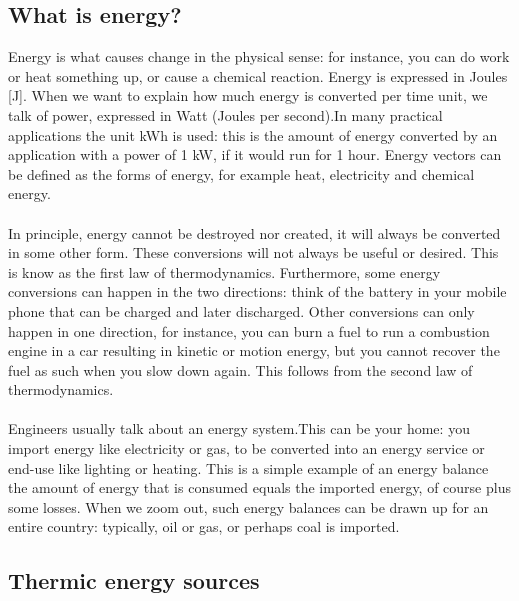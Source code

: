 \documentclass[../summary.tex]{subfiles}
\begin{document}
	\subsection{What is energy?}

	Energy is what causes change in the physical sense: for instance, you can do work or heat something up, or cause a chemical reaction. Energy is expressed in Joules [J]. When we want to explain how much energy is converted per time unit, we talk of power, expressed in Watt (Joules per second).In many practical applications the unit kWh is used: this is the amount of energy converted by an application with a power of 1 kW, if it would run for 1 hour. Energy vectors can be defined as the forms of energy, for example heat, electricity and chemical energy.
	\\\\
	In principle, energy cannot be destroyed nor created, it will always be converted in some other form. These conversions will not always be useful or desired. This is know as the first law of thermodynamics. Furthermore, some energy conversions can happen in the two directions: think of the battery in your mobile phone that can be charged and later discharged. Other conversions can only happen in one direction, for instance, you can burn a fuel to run a combustion engine in a car resulting in kinetic or motion energy, but you cannot recover the fuel as such when you slow down again. This follows from the second law of thermodynamics.
	\\\\
	Engineers usually talk about an energy system.This can be your home: you import energy like electricity or gas, to be converted into an energy service or end-use like lighting or heating. This is a simple example of an energy balance the amount of energy that is consumed equals the imported energy, of course plus some losses. When we zoom out, such energy balances can be drawn up for an entire country: typically, oil or gas, or perhaps coal is imported.
	
	\subsection{Thermic energy sources}
	
\end{document}
